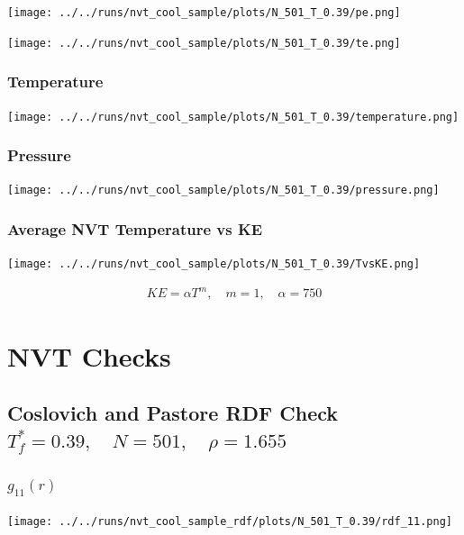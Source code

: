 \documentclass[a4paper,11pt,twoside]{article}
\begin{document}
\begin{center}
\texttt{[image: ../../runs/nvt\_cool\_sample/plots/N\_501\_T\_0.39/pe.png]}
\end{center}

\begin{center}
\texttt{[image: ../../runs/nvt\_cool\_sample/plots/N\_501\_T\_0.39/te.png]}
\end{center}
\subsubsection{Temperature}
\label{sec:orgd76d484}
\begin{center}
\texttt{[image: ../../runs/nvt\_cool\_sample/plots/N\_501\_T\_0.39/temperature.png]}
\end{center}
\subsubsection{Pressure}
\label{sec:org3d2bc5e}
\begin{center}
\texttt{[image: ../../runs/nvt\_cool\_sample/plots/N\_501\_T\_0.39/pressure.png]}
\end{center}
\subsubsection{Average NVT Temperature vs KE}
\label{sec:org117ca23}
\begin{center}
\texttt{[image: ../../runs/nvt\_cool\_sample/plots/N\_501\_T\_0.39/TvsKE.png]}
\end{center}

\begin{align*}
KE = \alpha T ^ m, \quad m = 1, \quad \alpha = 750
\end{align*}
\section{NVT Checks}
\label{sec:org71676f0}
\subsection{Coslovich and Pastore RDF Check \(T^*_f = 0.39, \quad N = 501, \quad \rho = 1.655\)}
\label{sec:orgc454348}
\subsubsection{\(g_{11}(r)\)}
\label{sec:orgccd783d}
\begin{center}
\texttt{[image: ../../runs/nvt\_cool\_sample\_rdf/plots/N\_501\_T\_0.39/rdf\_11.png]}
\end{center}
\end{document}
